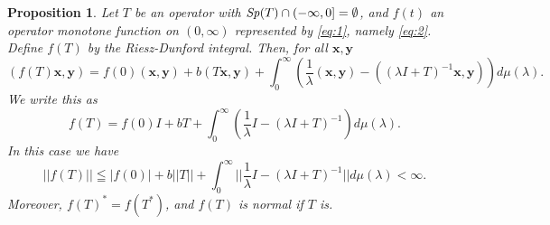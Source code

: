 \documentclass[reqno]{amsart}
\newtheorem{proposition}[theorem]{Proposition}
\theoremstyle{definition}
\theoremstyle{remark}
\begin{document}
\begin{proposition}\label{Prop:2-2}
Let $T$ be an operator with ${\it Sp}(T) \cap (-\infty, 0] = \emptyset$, and $f(t)$ an
 operator monotone function on $(0, \infty)$ represented by \eqref{eq:1}, namely 
\eqref{eq:2}. 
Define $f(T)$ by the Riesz-Dunford integral.   
Then, for all $\mathbf{x}, \mathbf{y}$
$$
 (f(T) \mathbf{x}, \mathbf{y})=  f(0) (\mathbf{x}, \mathbf{y})  + b (T \mathbf{x}, \mathbf{y})
 + \int_0^{\infty} \left(\frac{1}{\lambda}(\mathbf{x}, \mathbf{y}) - 
((\lambda I  + T)^{-1}\mathbf{x}, \mathbf{y})\right)  d\mu(\lambda).$$
 We write this as
\begin{equation}
 f(T)=  f(0) I  + b T + \int_0^{\infty} \left(\frac{1}{\lambda } I - (\lambda I  + T)^{-1}\right) d\mu(\lambda).\label{eq:3}
\end{equation}
In this case we have
$$|| f(T)|| \leqq   |f(0)|  + b ||T|| + \int_0^{\infty} ||\frac{1}{\lambda } I - (\lambda I  + T)^{-1}|| d\mu(\lambda)
<\infty.$$
Moreover,  $f(T)^* = f(T^*)$,  and  $f(T)$ is normal if $T$ is.

\end{proposition}
 
\end{document}
